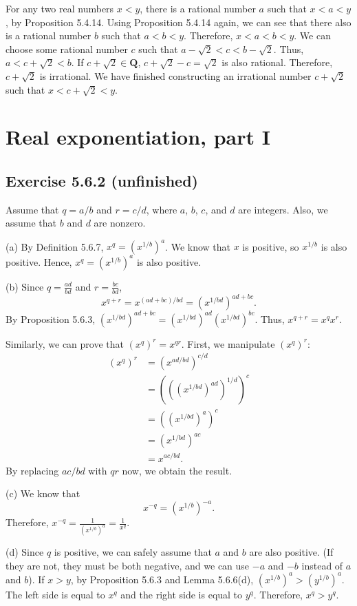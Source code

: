 \documentclass[12pt, oneside]{book}
\begin{document}
	For any two real numbers $x < y$, there is a rational number $a$ such that $x < a < y$, by Proposition 5.4.14. Using Proposition 5.4.14 again, we can see that there also is a rational number $b$ such that $a < b < y$. Therefore, $x < a < b < y$. We can choose some rational number $c$ such that $a - \sqrt{2} < c < b - \sqrt{2}$. Thus, $a < c + \sqrt{2} < b$. If $c + \sqrt{2} \in \mathbf{Q}$, $c + \sqrt{2} - c = \sqrt{2}$ is also rational. Therefore, $c + \sqrt{2}$ is irrational. We have finished constructing an irrational number $c + \sqrt{2}$ such that $x < c + \sqrt{2} < y$.

	\section{Real exponentiation, part I}

	\subsection*{Exercise 5.6.2 (unfinished)}

	Assume that $q = a / b$ and $r = c / d$, where $a$, $b$, $c$, and $d$ are integers. Also, we assume that $b$ and $d$ are nonzero.

	\bigskip
	\noindent (a) By Definition 5.6.7, $x^q = (x^{1 / b})^a$. We know that $x$ is positive, so $x^{1 / b}$ is also positive. Hence, $x^q = (x^{1 / b})^a$ is also positive.

	\bigskip
	\noindent (b) Since $q = \frac{ad}{bd}$ and $r = \frac{bc}{bd}$,
	\[x^{q + r} = x^{(ad + bc) / bd} = (x^{1 / bd})^{ad + bc}.\]
	By Proposition 5.6.3, $(x^{1 / bd})^{ad + bc} = (x^{1 / bd})^{ad} (x^{1 / bd})^{bc}$. Thus, $x^{q + r} = x^q x^r$.

	Similarly, we can prove that $(x^q)^r = x^{qr}$. First, we manipulate $(x^q)^r$:
	\[\begin{split}
		(x^q)^r &= (x^{ad / bd})^{c / d} \\
		&= (((x^{1 / bd})^{ad})^{1 / d})^c \\
		&= ((x^{1 / bd})^a)^c \\
		&= (x^{1 / bd})^{ac} \\
		&= x^{ac / bd}.
	\end{split}\]
	By replacing $ac / bd$ with $qr$ now, we obtain the result.

	\bigskip
	\noindent (c) We know that
	\[x^{-q} = (x^{1 / b})^{-a}.\]
	Therefore, $x^{-q} = \frac{1}{(x^{1 / b})^a} = \frac{1}{x^q}$.

	\bigskip
	\noindent (d) Since $q$ is positive, we can safely assume that $a$ and $b$ are also positive. (If they are not, they must be both negative, and we can use $-a$ and $-b$ instead of $a$ and $b$). If $x > y$, by Proposition 5.6.3 and Lemma 5.6.6(d), $(x^{1 / b})^a > (y^{1 / b})^a$. The left side is equal to $x^q$ and the right side is equal to $y^q$. Therefore, $x^q > y^q$.
\end{document}
